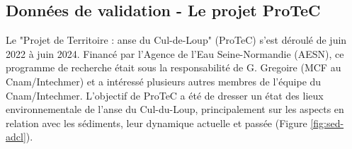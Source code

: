\documentclass[10pt,a4paper,titlepage]{article}
\begin{document}



\subsection{Données de validation - Le projet ProTeC}
\label{sub:protec}

Le "Projet de Territoire : anse du Cul-de-Loup" (ProTeC) s'est déroulé de juin 2022 à juin 2024. Financé par l'Agence de l'Eau Seine-Normandie (AESN), ce programme de recherche était sous la responsabilité de G. Gregoire (MCF au Cnam/Intechmer) et a intéressé plusieurs autres membres de l'équipe du Cnam/Intechmer. L'objectif de ProTeC a été de dresser un état des lieux environnementale de l'anse du Cul-du-Loup, principalement sur les aspects en relation avec les sédiments, leur dynamique actuelle et passée (Figure \ref{fig:sed-adcl}).
\end{document}
